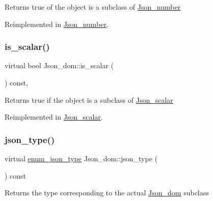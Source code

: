 \begin{DoxyReturn}{Returns}
true of the object is a subclass of \mbox{\hyperlink{classJson__number}{Json\+\_\+number}} 
\end{DoxyReturn}


Reimplemented in \mbox{\hyperlink{classJson__number_ab6ef431e896247478edf9b28d4846ac7}{Json\+\_\+number}}.

\mbox{\label{classJson__dom_a0288197126a1427a5f88fa8b94d6de3d}} 
\subsubsection{\texorpdfstring{is\+\_\+scalar()}{is\_scalar()}}
{\footnotesize\ttfamily virtual bool Json\+\_\+dom\+::is\+\_\+scalar (\begin{DoxyParamCaption}{ }\end{DoxyParamCaption}) const\hspace{0.3cm}{\ttfamily [inline]}, {\ttfamily [virtual]}}

\begin{DoxyReturn}{Returns}
true if the object is a subclass of \mbox{\hyperlink{classJson__scalar}{Json\+\_\+scalar}} 
\end{DoxyReturn}


Reimplemented in \mbox{\hyperlink{classJson__scalar_a521c56a686010b1d60f612d1c376aa85}{Json\+\_\+scalar}}.

\mbox{\label{classJson__dom_aed953eca1e112aade66511ad1bbf82b8}} 
\subsubsection{\texorpdfstring{json\+\_\+type()}{json\_type()}}
{\footnotesize\ttfamily virtual \mbox{\hyperlink{classJson__dom_af37eed7dfe1da1d6507d3ab85320eb03}{enum\+\_\+json\+\_\+type}} Json\+\_\+dom\+::json\+\_\+type (\begin{DoxyParamCaption}{ }\end{DoxyParamCaption}) const\hspace{0.3cm}{\ttfamily [pure virtual]}}

\begin{DoxyReturn}{Returns}
the type corresponding to the actual \mbox{\hyperlink{classJson__dom}{Json\+\_\+dom}} subclass 
\end{DoxyReturn}


